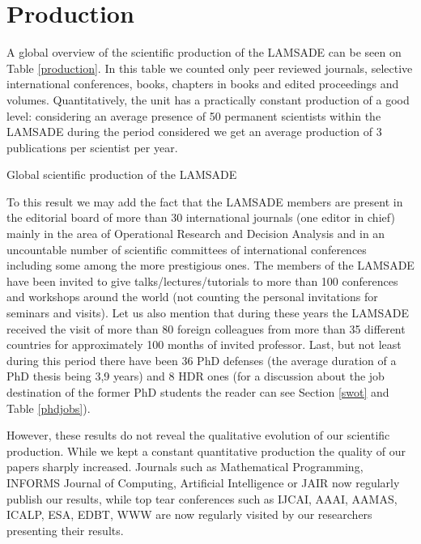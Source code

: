 \section{Production}\label{secproduction}

A global overview of the scientific production of the LAMSADE can be seen on Table \ref{production}. In this table we counted only peer reviewed journals, selective international conferences, books, chapters in books and edited proceedings and volumes. Quantitatively, the unit has a practically constant production of a good level: considering an average presence of 50 permanent scientists within the LAMSADE during the period considered we get an average production of 3 publications per scientist per year.
\begin{table}
  \centering
  \caption{Global scientific production of the LAMSADE}\label{production}
\end{table}

To this result we may add the fact that the LAMSADE members are present in the editorial board of more than 30 international journals (one editor in chief) mainly in the area of Operational Research and Decision Analysis and in an uncountable number of scientific committees of international conferences including some among the more prestigious ones. The members of the LAMSADE have been invited to give talks/lectures/tutorials to more than 100 conferences and workshops around the world (not counting the personal invitations for seminars and visits). Let us also mention that during these years the LAMSADE received the visit of more than 80 foreign colleagues from more than 35 different countries for approximately 100 months of invited professor. Last, but not least during this period there have been 36 PhD defenses (the average duration of a PhD thesis being 3,9 years) and 8 HDR ones (for a discussion about the job destination of the former PhD students the reader can see Section \ref{swot} and Table \ref{phdjobs}).

However, these results do not reveal the qualitative evolution of our scientific production. While we kept a constant quantitative production the quality of our papers sharply increased. Journals such as Mathematical Programming, INFORMS Journal of Computing, Artificial Intelligence or JAIR now regularly publish our results, while top tear conferences such as IJCAI, AAAI, AAMAS, ICALP, ESA, EDBT, WWW are now regularly visited by our researchers presenting their results.

